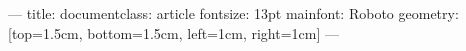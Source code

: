 ---
title:
documentclass: article
fontsize: 13pt
mainfont: Roboto
geometry: [top=1.5cm, bottom=1.5cm, left=1cm, right=1cm]
---
